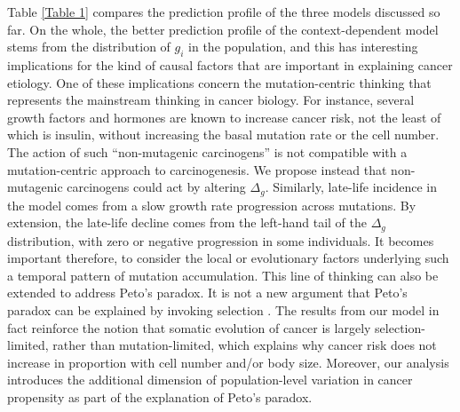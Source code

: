 \documentclass[10pt,twocolumn,twoside]{article}
\begin{document}
Table \ref{Table 1} compares the prediction profile of the three models discussed so far. On the whole, the better prediction profile of the context-dependent model stems from the distribution of $g_{i}$ in the population, and this has interesting implications for the kind of causal factors that are important in explaining cancer etiology. One of these implications concern the mutation-centric thinking that represents the mainstream thinking in cancer biology. For instance, several growth factors and hormones are known to increase cancer risk, not the least of which is insulin, without increasing the basal mutation rate or the cell number. The action of such ``non-mutagenic carcinogens'' is not compatible with a mutation-centric approach to carcinogenesis. We propose instead that non-mutagenic carcinogens could act by altering $\Delta_{g}$.
Similarly, late-life incidence in the model comes from a slow growth rate progression across mutations. By extension, the late-life decline comes from the left-hand tail of the $\Delta_{g}$ distribution, with zero or negative progression in some individuals. It becomes important therefore, to consider the local or evolutionary factors underlying such a temporal pattern of mutation accumulation.
This line of thinking can also be extended to address Peto's paradox. It is not a new argument that Peto's paradox can be explained by invoking selection \cite{Caulin2011,Noble2015,Tollis2017b}. The results from our model in fact reinforce the notion that somatic evolution of cancer is largely selection-limited, rather than mutation-limited, which explains why cancer risk does not increase in proportion with cell number and/or body size. Moreover, our analysis introduces the additional dimension of population-level variation in cancer propensity as part of the explanation of Peto's paradox.
\end{document}
